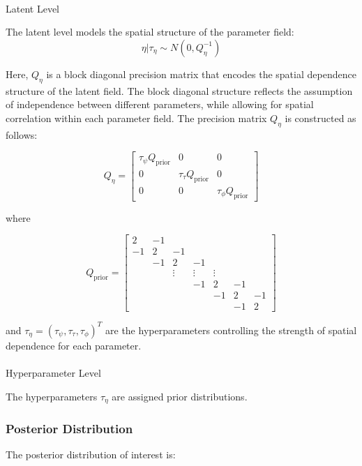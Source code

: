 \documentclass[
  letterpaper,
  DIV=11,
  numbers=noendperiod]{scrartcl}
\makeatletter
\let\oldparagraph\paragraph
\renewcommand{\paragraph}{
    \@ifstar
      \xxxParagraphStar
      \xxxParagraphNoStar
  }
\newcommand{\xxxParagraphStar}[1]{\oldparagraph*{#1}\mbox{}}
\newcommand{\xxxParagraphNoStar}[1]{\oldparagraph{#1}\mbox{}}
\makeatother
\begin{document}
\paragraph{Latent Level}\label{latent-level}

The latent level models the spatial structure of the parameter field: \[
\eta | \tau_\eta \sim N(0, Q_\eta^{-1})
\]

Here, \(Q_\eta\) is a block diagonal precision matrix that encodes the
spatial dependence structure of the latent field. The block diagonal
structure reflects the assumption of independence between different
parameters, while allowing for spatial correlation within each parameter
field. The precision matrix \(Q_\eta\) is constructed as follows:

\[
Q_\eta = \begin{bmatrix}
\tau_\psi Q_{\text{prior}} & 0 & 0 \\
0 & \tau_\tau Q_{\text{prior}} & 0 \\
0 & 0 & \tau_\phi Q_{\text{prior}}
\end{bmatrix}
\]

where

\[
Q_{\text{prior}} = \begin{bmatrix}
2 & -1 \\
-1 & 2 & -1 \\
& -1 & 2 & -1 \\
& & \vdots & \vdots & \vdots \\
& & & -1 & 2 & -1 \\
& & & & -1 & 2 & -1 \\
& & & & & -1 & 2
\end{bmatrix}
\]

and \(\tau_\eta = \left(\tau_\psi, \tau_\tau, \tau_\phi\right)^T\) are
the hyperparameters controlling the strength of spatial dependence for
each parameter.

\paragraph{Hyperparameter Level}\label{hyperparameter-level}

The hyperparameters \(\tau_\eta\) are assigned prior distributions.

\subsubsection{Posterior Distribution}\label{posterior-distribution}

The posterior distribution of interest is:
\end{document}
